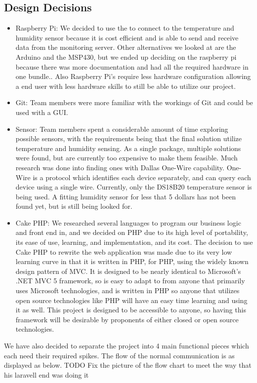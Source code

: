 \documentclass{report}
\begin{document}
	

\newpage
\subsection*{Design Decisions}
\begin{itemize}
\item Raspberry Pi: We decided to use the to connect to the temperature and humidity sensor because it is cost efficient and is able to send and receive data from the monitoring server. Other alternatives we looked at are the Arduino and the MSP430, but we ended up deciding on the raspberry pi because there was more documentation and had all the required hardware in one bundle.. Also Raspberry Pi’s require less hardware configuration allowing a end user with less hardware skills to still be able to utilize our project.
\item Git: Team members were more familiar with the workings of Git and could be used with a GUI.
\item Sensor: Team members spent a considerable amount of time exploring possible sensors, with the requirements being that the final solution utilize temperature and humidity sensing. As a single package, multiple solutions were found, but are currently too expensive to make them feasible. Much research was done into finding ones with Dallas One-Wire capability. One-Wire is a protocol which identifies each device separately, and can query each device using a single wire. Currently, only the DS18B20 temperature sensor is being used. A fitting humidity sensor for less that 5 dollars has not been found yet, but is still being looked for.
\item Cake PHP: We researched several languages to program our business logic and front end in, and we decided on PHP due to its high level of portability, its ease of use, learning, and implementation, and its cost.  The decision to use Cake PHP to rewrite the web application was made due to its very low learning curve in that it is written in PHP, for PHP, using the widely known design pattern of MVC.  It is designed to be nearly identical to Microsoft’s .NET MVC 5 framework, so is easy to adapt to from anyone that primarily uses Microsoft technologies, and is written in PHP so anyone that utilizes open source technologies like PHP will have an easy time learning and using it as well.  This project is designed to be accessible to anyone, so having this framework will be desirable by proponents of either closed or open source technologies. 
\end{itemize}
We have also decided to separate the project into 4 main functional pieces which each need their required spikes. The flow of the normal communication is as displayed as below.
TODO Fix the picture of the flow chart to meet the way that his laravell end was doing it
\newpage
\end{document}
